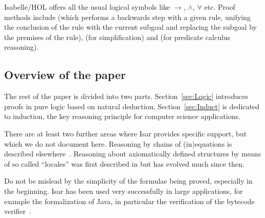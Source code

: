 Isabelle/HOL offers all the usual logical symbols like $\longrightarrow$, $\land$,
$\forall$ etc. Proof methods include  (which performs a backwards
step with a given rule, unifying the conclusion of the rule with the
current subgoal and replacing the subgoal by the premises of the
rule),  (for simplification) and  (for predicate
calculus reasoning).

\subsection{Overview of the paper}

The rest of the paper is divided into two parts.
Section~\ref{sec:Logic} introduces proofs in pure logic based on
natural deduction. Section~\ref{sec:Induct} is dedicated to induction,
the key reasoning principle for computer science applications.

There are at least two further areas where Isar provides specific support,
but which we do not document here. Reasoning by chains of (in)equations is
described elsewhere~\cite{BauerW-TPHOLs01}.  Reasoning about axiomatically
defined structures by means of so called ``locales'' was first described in
\cite{KWP-TPHOLs99} but has evolved much since then.

Do not be mislead by the simplicity of the formulae being proved,
especially in the beginning. Isar has been used very successfully in
large applications, for example the formalization of Java, in
particular the verification of the bytecode verifier~\cite{KleinN-TCS}.
